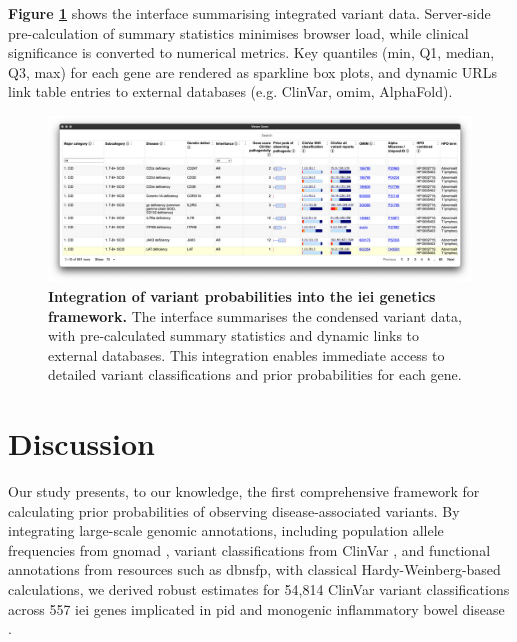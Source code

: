 \textbf{Figure \ref{fig:var_risk_est_iei_genetics}} shows the interface summarising integrated variant data. Server-side pre-calculation of summary statistics minimises browser load, while clinical significance is converted to numerical metrics. Key quantiles (min, Q1, median, Q3, max) for each gene are rendered as sparkline box plots, and dynamic URLs link table entries to external databases (e.g. ClinVar, \ac{omim}, AlphaFold).

\begin{figure}[ht]
  \centering
  \includegraphics[width=1\textwidth]{../images/var_risk_est_iei_genetics.png}
  \caption{
    \textbf{Integration of variant probabilities into the \ac{iei} genetics framework.}
    The interface summarises the condensed variant data, with pre-calculated summary statistics and dynamic links to external databases. This integration enables immediate access to detailed variant classifications and prior probabilities for each gene.
  }
  \label{fig:var_risk_est_iei_genetics}
\end{figure}

\FloatBarrier
\section{Discussion}

Our study presents, to our knowledge, the first comprehensive framework for calculating prior probabilities of observing disease-associated variants. By integrating large-scale genomic annotations, including population allele frequencies from \ac{gnomad} \cite{karczewski2020mutational}, variant classifications from ClinVar \cite{landrum_clinvar_2018}, and functional annotations from resources such as \ac{dbnsfp}, with classical Hardy-Weinberg-based calculations, we derived robust estimates for 54,814 ClinVar variant classifications across 557 \ac{iei} genes implicated in \ac{pid} and monogenic inflammatory bowel disease \cite{lawless_panelapprex_2025, tangye_human_2022}.

